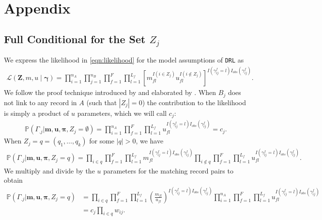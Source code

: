 \documentclass[12pt,letterpaper]{article}
\newcommand{\1}[1]{\mathbb{I}\!\left[#1\right]} %
\begin{document}
\pagebreak



\pagebreak

\section{Appendix}
\label{sec:appendix}

\subsection{Full Conditional for the Set $Z_j$}\label{app:joint-distribution}

We express the likelihood in \eqref{eqn:likelihood} for the model assumptions of \texttt{DRL} as
\begin{align} \label{eqn:drl-likelihood}
	\mathcal{L}(\bm{Z}, m,u\mid\bm{\gamma})=\prod_{i=1}^{n_A}\prod_{j=1}^{n_B}\prod_{f=1}^F\prod_{l=1}^{L_f}\left[m_{fl}^{I(i \in Z_j)}u_{fl}^{I(i \notin Z_j)}\right] ^{I(\gamma_{ij}^{f} = l) I_{obs}(\gamma_{ij}^f)}.
\end{align}
We follow the proof technique introduced by \cite{wortman2019} and elaborated by \cite{kundinger_2023}. When $B_j$ does not link to any record in $A$ (such that $|Z_j| = 0$) the contribution to the likelihood is simply a product of $u$ parameters, which we will call $c_j$:
\begin{align}
	\mathbb{P}(\Gamma_{.j}| \bm{m}, \bm{u}, \bm{\pi}, Z_j = \emptyset) = \prod_{i=1}^{n_A}\prod_{f=1}^{F}\prod_{l=1}^{L_f} u_{fl}^{I(\gamma_{ij}^f = l)I_{obs}(\gamma_{ij}^f)} = c_j.
\end{align}
When $Z_j = q =  (q_1, \ldots, q_k)$ for some $|q| > 0$, we have
\begin{align}
	\mathbb{P}(\Gamma_{.j}| \bm{m}, \bm{u}, \bm{\pi},  Z_j = q) =\prod_{i \in q}\prod_{f=1}^{F}\prod_{l=1}^{L_f} m_{fl}^{I(\gamma_{ij}^f = l)I_{obs}(\gamma_{ij}^f)}  \prod_{i \notin q}\prod_{f=1}^{F}\prod_{l=1}^{L_f} u_{fl}^{I(\gamma_{ij}^f = l)I_{obs}(\gamma_{ij}^f)}.
\end{align}
We multiply and divide by the $u$ parameters for the matching record pairs to obtain
\begin{align}
	\mathbb{P}(\Gamma_{.j}| \bm{m}, \bm{u}, \bm{\pi}, Z_j = q) &= \prod_{i \in q}\prod_{f=1}^{F}\prod_{l=1}^{L_f} \left(\frac{m_{fl}}{u_{fl}}\right)^{I(\gamma_{ij}^f = l)I_{obs}(\gamma_{ij}^f)}  \prod_{i = 1}^{n_A}\prod_{f=1}^{F}\prod_{l=1}^{L_f} u_{fl}^{I(\gamma_{ij}^f = l)I_{obs}(\gamma_{ij}^f)} \\
	&= c_j \prod_{i \in q} w_{ij} .
\end{align}
\end{document}
